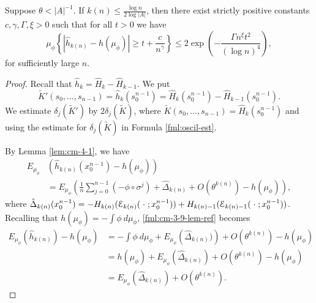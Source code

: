 \begin{theorem}\label{thm:cm-4-2}
	Suppose $\theta < |A|^{-1}$. If $k(n) \leq \frac{\log{n}}{2\log{|A|}}$, then there exist strictly positive constants $c, \gamma, \Gamma, \xi > 0$ such that for all $t > 0$ we have
	\begin{equation}
		\mu_\phi\left\{\left|\hat{h}_{k(n)} - h(\mu_\phi)\right| \geq t + \frac{c}{n^\gamma}\right\} \leq 2\exp\left(-\frac{\Gamma n^\xi t^2}{(\log{n})^4}\right),
	\end{equation}
	for sufficiently large $n$.
	\begin{proof}
		Recall that $\hat{h}_k = \hat{H}_k - \hat{H}_{k - 1}$. We put
		\[
			\tilde{K}'(s_0, \dots, s_{n - 1}) = \hat{h}_k(s_0^{n - 1}) = \hat{H}_k(s_0^{n - 1}) - \hat{H}_{k - 1}(s_0^{n - 1}).
		\]
		We estimate $\delta_j(\tilde{K}')$ by $2\delta_j(\tilde{K})$, where $\tilde{K}(s_0, \dots, s_{n - 1}) = \hat{H}_k(s_0^{n - 1})$ and using the estimate for $\delta_j(\tilde{K})$ in Formula \eqref{fml:oscil-est}.
		
		By Lemma \ref{lem:cm-4-1}, we have
		\begin{align}
			E_{\mu_\phi}&\left(\hat{h}_{k(n)}(x_0^{n - 1}) - h(\mu_\phi)\right) \nonumber \\
				&= E_{\mu_\phi}\left(\frac{1}{n}\sum_{j = 0}^{n - 1}(-\phi \circ \sigma^j) + \hat{\Delta}_{k(n)} + O(\theta^{k(n)}) - h(\mu_\phi)\right), \label{fml:cm-3-9-lem-ref}
		\end{align}
		where $\hat{\Delta}_{k(n)}(x_0^{n - 1}) = -H_{k(n)}(\mathcal{E}_{k(n)}(\mathrel{}\cdot\mathrel{}; x_0^{n - 1})) + H_{k(n) - 1}(\mathcal{E}_{k(n) - 1}(\mathrel{}\cdot\mathrel{}; x_0^{n - 1}))$. 
		Recalling that $h(\mu_\phi) = -\int{\phi\ d\mu_\phi}$, \eqref{fml:cm-3-9-lem-ref} becomes
		\begin{align*}
			E_{\mu_\phi}\left(\hat{h}_{k(n)}\right) - h(\mu_\phi) &= -\int{\phi\ d\mu_\phi} + E_{\mu_\phi}\left(\hat{\Delta}_{k(n)})\right) + O(\theta^{k(n)}) - h(\mu_\phi) \\
				&= h(\mu_\phi) + E_{\mu_\phi}\left(\hat{\Delta}_{k(n)}\right) + O(\theta^{k(n)}) - h(\mu_\phi) \\
				&= E_{\mu_\phi}\left(\hat{\Delta}_{k(n)}\right) + O(\theta^{k(n)}).
		\end{align*}
		

\end{proof}
\end{theorem}
